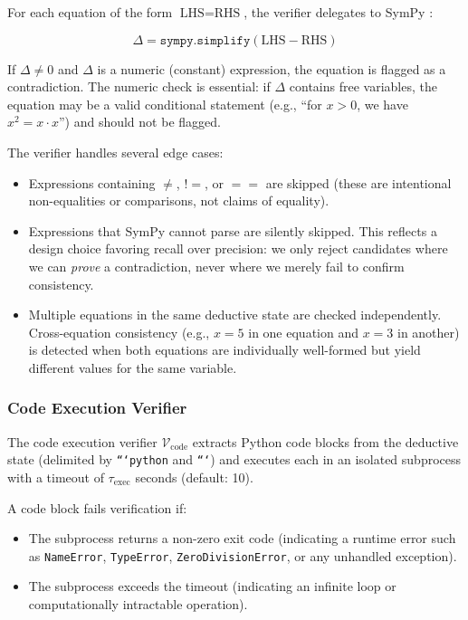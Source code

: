 \documentclass[11pt,a4paper]{article}
\begin{document}
For each equation of the form $\text{LHS} = \text{RHS}$, the verifier
delegates to SymPy \citep{meurer2017sympy}:

\begin{equation}
\Delta = \texttt{sympy.simplify}\!\left(\text{LHS} - \text{RHS}\right)
\end{equation}

If $\Delta \neq 0$ and $\Delta$ is a numeric (constant) expression, the
equation is flagged as a contradiction. The numeric check is essential: if
$\Delta$ contains free variables, the equation may be a valid conditional
statement (e.g., ``for $x > 0$, we have $x^2 = x \cdot x$'') and should not be
flagged.

The verifier handles several edge cases:
\begin{itemize}[nosep]
    \item Expressions containing $\neq$, $!=$, or $==$ are skipped (these are
    intentional non-equalities or comparisons, not claims of equality).
    \item Expressions that SymPy cannot parse are silently skipped. This
    reflects a design choice favoring recall over precision: we only reject
    candidates where we can \emph{prove} a contradiction, never where we merely
    fail to confirm consistency.
    \item Multiple equations in the same deductive state are checked
    independently. Cross-equation consistency (e.g., $x = 5$ in one equation
    and $x = 3$ in another) is detected when both equations are individually
    well-formed but yield different values for the same variable.
\end{itemize}

\subsubsection{Code Execution Verifier}

The code execution verifier $\mathcal{V}_{\text{code}}$ extracts Python code
blocks from the deductive state (delimited by \texttt{```python} and
\texttt{```}) and executes each in an isolated subprocess with a timeout of
$\tau_{\text{exec}}$ seconds (default: 10).

A code block fails verification if:
\begin{itemize}[nosep]
    \item The subprocess returns a non-zero exit code (indicating a runtime
    error such as \texttt{NameError}, \texttt{TypeError}, \texttt{ZeroDivisionError},
    or any unhandled exception).
    \item The subprocess exceeds the timeout (indicating an infinite loop or
    computationally intractable operation).
\end{itemize}
\end{document}
